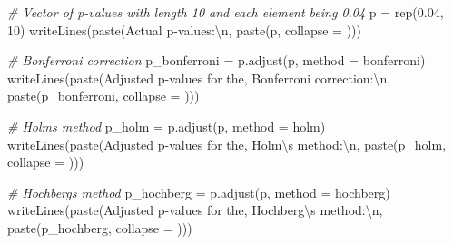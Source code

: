 \documentclass[
]{book}
\newenvironment{Shaded}{\begin{snugshade}}{\end{snugshade}}
\newcommand{\AttributeTok}[1]{\textcolor[rgb]{0.77,0.63,0.00}{#1}}
\newcommand{\CommentTok}[1]{\textcolor[rgb]{0.56,0.35,0.01}{\textit{#1}}}
\newcommand{\DecValTok}[1]{\textcolor[rgb]{0.00,0.00,0.81}{#1}}
\newcommand{\FloatTok}[1]{\textcolor[rgb]{0.00,0.00,0.81}{#1}}
\newcommand{\FunctionTok}[1]{\textcolor[rgb]{0.00,0.00,0.00}{#1}}
\newcommand{\NormalTok}[1]{#1}
\newcommand{\OtherTok}[1]{\textcolor[rgb]{0.56,0.35,0.01}{#1}}
\newcommand{\SpecialCharTok}[1]{\textcolor[rgb]{0.00,0.00,0.00}{#1}}
\newcommand{\StringTok}[1]{\textcolor[rgb]{0.31,0.60,0.02}{#1}}
\begin{document}
\begin{Shaded}
\begin{Highlighting}[]
\CommentTok{\# Vector of p{-}values with length 10 and each element being 0.04}
\NormalTok{p }\OtherTok{=} \FunctionTok{rep}\NormalTok{(}\FloatTok{0.04}\NormalTok{, }\DecValTok{10}\NormalTok{)}
\FunctionTok{writeLines}\NormalTok{(}\FunctionTok{paste}\NormalTok{(}\StringTok{\textquotesingle{}Actual p{-}values:}\SpecialCharTok{\textbackslash{}n}\StringTok{\textquotesingle{}}\NormalTok{, }\FunctionTok{paste}\NormalTok{(p, }\AttributeTok{collapse =} \StringTok{\textquotesingle{} \textquotesingle{}}\NormalTok{)))}

\CommentTok{\# Bonferroni correction}
\NormalTok{p\_bonferroni }\OtherTok{=} \FunctionTok{p.adjust}\NormalTok{(p, }\AttributeTok{method =} \StringTok{\textquotesingle{}bonferroni\textquotesingle{}}\NormalTok{)}
\FunctionTok{writeLines}\NormalTok{(}\FunctionTok{paste}\NormalTok{(}\StringTok{\textquotesingle{}Adjusted p{-}values for the\textquotesingle{}}\NormalTok{,}
                 \StringTok{\textquotesingle{}Bonferroni correction:}\SpecialCharTok{\textbackslash{}n}\StringTok{\textquotesingle{}}\NormalTok{,}
                 \FunctionTok{paste}\NormalTok{(p\_bonferroni, }\AttributeTok{collapse =} \StringTok{\textquotesingle{} \textquotesingle{}}\NormalTok{)))}

\CommentTok{\# Holm\textquotesingle{}s method}
\NormalTok{p\_holm }\OtherTok{=} \FunctionTok{p.adjust}\NormalTok{(p, }\AttributeTok{method =} \StringTok{\textquotesingle{}holm\textquotesingle{}}\NormalTok{)}
\FunctionTok{writeLines}\NormalTok{(}\FunctionTok{paste}\NormalTok{(}\StringTok{\textquotesingle{}Adjusted p{-}values for the\textquotesingle{}}\NormalTok{,}
                 \StringTok{\textquotesingle{}Holm}\SpecialCharTok{\textbackslash{}\textquotesingle{}}\StringTok{s method:}\SpecialCharTok{\textbackslash{}n}\StringTok{\textquotesingle{}}\NormalTok{,}
                 \FunctionTok{paste}\NormalTok{(p\_holm, }\AttributeTok{collapse =} \StringTok{\textquotesingle{} \textquotesingle{}}\NormalTok{)))}

\CommentTok{\# Hochberg\textquotesingle{}s method}
\NormalTok{p\_hochberg }\OtherTok{=} \FunctionTok{p.adjust}\NormalTok{(p, }\AttributeTok{method =} \StringTok{\textquotesingle{}hochberg\textquotesingle{}}\NormalTok{)}
\FunctionTok{writeLines}\NormalTok{(}\FunctionTok{paste}\NormalTok{(}\StringTok{\textquotesingle{}Adjusted p{-}values for the\textquotesingle{}}\NormalTok{,}
                 \StringTok{\textquotesingle{}Hochberg}\SpecialCharTok{\textbackslash{}\textquotesingle{}}\StringTok{s method:}\SpecialCharTok{\textbackslash{}n}\StringTok{\textquotesingle{}}\NormalTok{,}
                 \FunctionTok{paste}\NormalTok{(p\_hochberg, }\AttributeTok{collapse =} \StringTok{\textquotesingle{} \textquotesingle{}}\NormalTok{)))}


\end{Highlighting}
\end{Shaded}
\end{document}
